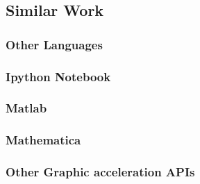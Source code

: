 \subsection{Similar Work}

\subsubsection{Other Languages}
\subsubsection{Ipython Notebook}
\subsubsection{Matlab}
\subsubsection{Mathematica}
\subsubsection{Other Graphic acceleration APIs}